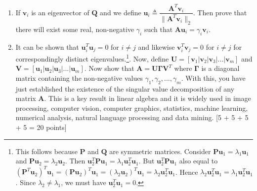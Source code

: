 \documentclass[11pt]{article}
\begin{document}
\begin{enumerate}
\begin{enumerate}
\item If $\boldsymbol{v}_i$ is an eigenvector of $\boldsymbol{Q}$ and we define $\boldsymbol{u}_i \triangleq \dfrac{\boldsymbol{A}^T \boldsymbol{v}_i}{\|\boldsymbol{A}^T \boldsymbol{v}_i\|_2}$. Then prove that there will exist some real, non-negative $\gamma_i$ such that $\boldsymbol{Au}_i = \gamma_i \boldsymbol{v}_i$.

\item It can be shown that $\boldsymbol{u}^T_i \boldsymbol{u}_j = 0$ for $i \neq j$ and likewise $\boldsymbol{v}^T_i \boldsymbol{v}_j = 0$ for $i \neq j$ for correspondingly distinct eigenvalues.\footnote{This follows because $\boldsymbol{P}$ and $\boldsymbol{Q}$ are symmetric matrices. Consider $\boldsymbol{Pu}_1 = \lambda_1 \boldsymbol{u}_1$ and $\boldsymbol{Pu}_2 = \lambda_2 \boldsymbol{u}_2$. Then $\boldsymbol{u}^T_2 \boldsymbol{P u}_1 = \lambda_1 \boldsymbol{u}^T_2 \boldsymbol{u}_1$. But $\boldsymbol{u}^T_2 \boldsymbol{P} \boldsymbol{u}_1$ also equal to $(\boldsymbol{P}^T \boldsymbol{u}_2)^T \boldsymbol{u}_1 = (\boldsymbol{P} \boldsymbol{u}_2)^T \boldsymbol{u}_1 = (\lambda_2 \boldsymbol{u}_2)^T \boldsymbol{u}_1 = \lambda_2 \boldsymbol{u}^T_2 \boldsymbol{u}_1$. Hence $\lambda_2 \boldsymbol{u}^T_2 \boldsymbol{u}_1 = \lambda_1 \boldsymbol{u}^T_2 \boldsymbol{u}_1$. Since $\lambda_2 \neq \lambda_1$, we must have $\boldsymbol{u}^T_2 \boldsymbol{u}_1 = 0$. }. Now, define $\boldsymbol{U} = [\boldsymbol{v}_1 | \boldsymbol{v}_2 | \boldsymbol{v}_3 | ...|\boldsymbol{v}_m]$ and $\boldsymbol{V} = [\boldsymbol{u}_1 | \boldsymbol{u}_2 | \boldsymbol{u}_3 | ... |\boldsymbol{u}_m]$. Now show that $\boldsymbol{A} = \boldsymbol{U} \boldsymbol{\Gamma} \boldsymbol{V}^T$ where $\boldsymbol{\Gamma}$ is a diagonal matrix containing the non-negative values $\gamma_1, \gamma_2, ..., \gamma_m$. With this, you have just established the existence of the singular value decomposition of any matrix $\boldsymbol{A}$. This is a key result in linear algebra and it is widely used in image processing, computer vision, computer graphics, statistics, machine learning, numerical analysis, natural language processing and data mining. \textsf[5 + 5 + 5 + 5 = 20 points]
\end{enumerate}


\end{enumerate}
\end{document}
